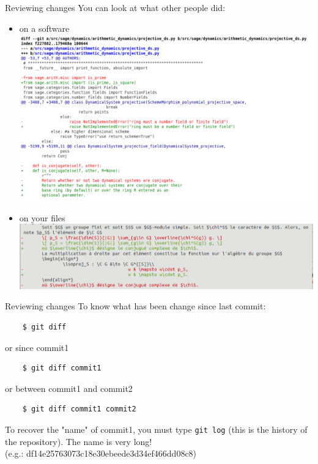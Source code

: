 \documentclass{beamer}
\begin{document}
	\begin{frame}{Reviewing changes}
	You can look at what other people did:
	\begin{itemize}
		\item on a software\\
		\includegraphics[width=0.8\linewidth]{diff_on_sage_2}  %
		\item on your files\\
		\includegraphics[width=0.8\linewidth]{diff_on_latex}
	\end{itemize}
	\end{frame}

	\begin{frame}[fragile]{Reviewing changes}
	To know what has been change since last commit:
	\begin{verbatim}
	$ git diff
	\end{verbatim}
	or since commit1 
	\begin{verbatim}
	$ git diff commit1
	\end{verbatim}
	or between commit1 and commit2
	\begin{verbatim}
	$ git diff commit1 commit2
	\end{verbatim}
	\begin{tcolorbox}[colback=cyan!30]
	To recover the "name" of commit1, you must type \texttt{git log} (this is the history of the repository). The name is very long!\\
	(e.g.: df14e25763073c18e30ebeede3d34ef466dd08c8)
	\end{tcolorbox}
	\end{frame}
\end{document}
